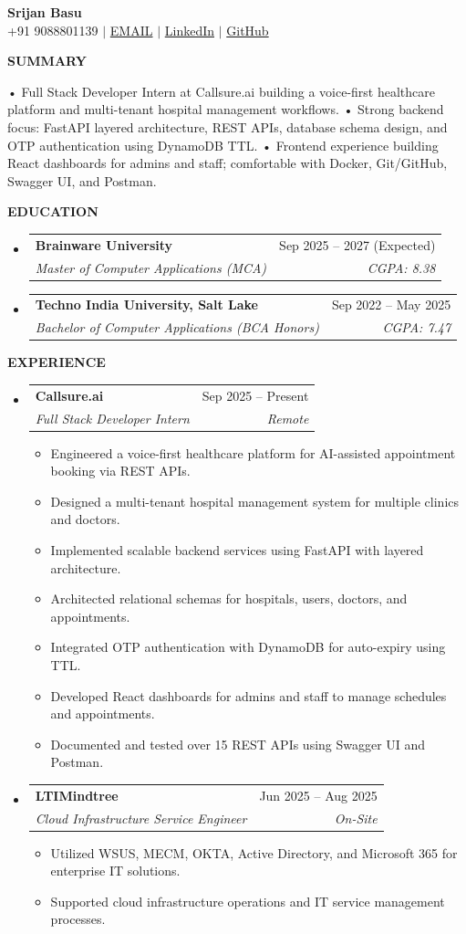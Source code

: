 \documentclass[a4paper,10pt]{article}
\makeatletter
\newcommand{\resheading}[1]{
  \vspace{8pt}
  {\color{black} \textbf{\large #1}}
  \vspace{-5pt}
  \hrulefill
  \vspace{3pt}
}
\newcommand{\ressubheading}[4]{
  \begin{tabular*}{\textwidth}{l@{\extracolsep{\fill}}r}
    \textbf{#1} & #2 \\
    \textit{\small #3} & \textit{\small #4} \\
  \end{tabular*}\vspace{-5pt}
}
\newcommand{\resitem}[1]{
  \item \small{
    {#1 \vspace{-2pt}}
  }
}
\makeatother
\begin{document}
\begin{center}
    \textbf{\Huge Srijan Basu} \\ \vspace{3pt}
    \small +91 9088801139 $|$ \href{mailto:2003srijanbasu@gmail.com}{{{EMAIL}}} $|$ 
    \href{https://}{LinkedIn} $|$ 
    \href{https://}{GitHub} 
\end{center}

\resheading{SUMMARY}
\small • Full Stack Developer Intern at Callsure.ai building a voice-first healthcare platform and multi-tenant hospital management workflows.
• Strong backend focus: FastAPI layered architecture, REST APIs, database schema design, and OTP authentication using DynamoDB TTL.
• Frontend experience building React dashboards for admins and staff; comfortable with Docker, Git/GitHub, Swagger UI, and Postman.


\resheading{EDUCATION}
\begin{itemize}[leftmargin=*,nosep]
\item[] \ressubheading{Brainware University}{Sep 2025 – 2027 (Expected)}{Master of Computer Applications (MCA)}{CGPA: 8.38}
\item[] \ressubheading{Techno India University, Salt Lake}{Sep 2022 – May 2025}{Bachelor of Computer Applications (BCA Honors)}{CGPA: 7.47}
\end{itemize}

\resheading{EXPERIENCE}
\begin{itemize}[leftmargin=*,nosep]
\item[] \ressubheading{Callsure.ai}{Sep 2025 – Present}{Full Stack Developer Intern}{Remote}
\begin{itemize}[leftmargin=12pt,nosep,topsep=2pt]
  \resitem{Engineered a voice-first healthcare platform for AI-assisted appointment booking via REST APIs.}
  \resitem{Designed a multi-tenant hospital management system for multiple clinics and doctors.}
  \resitem{Implemented scalable backend services using FastAPI with layered architecture.}
  \resitem{Architected relational schemas for hospitals, users, doctors, and appointments.}
  \resitem{Integrated OTP authentication with DynamoDB for auto-expiry using TTL.}
  \resitem{Developed React dashboards for admins and staff to manage schedules and appointments.}
  \resitem{Documented and tested over 15 REST APIs using Swagger UI and Postman.}
\end{itemize}
\item[] \ressubheading{LTIMindtree}{Jun 2025 – Aug 2025}{Cloud Infrastructure Service Engineer}{On-Site}
\begin{itemize}[leftmargin=12pt,nosep,topsep=2pt]
  \resitem{Utilized WSUS, MECM, OKTA, Active Directory, and Microsoft 365 for enterprise IT solutions.}
  \resitem{Supported cloud infrastructure operations and IT service management processes.}
\end{itemize}
\end{itemize}
\end{document}
